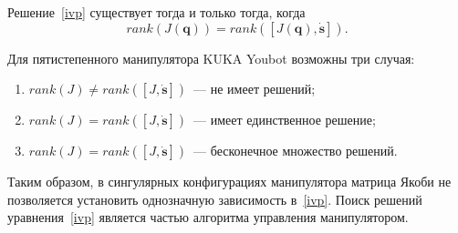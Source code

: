 Решение~\eqref{ivp} существует тогда и только тогда, когда 
\begin{equation}
	rank(J(\mathbf{q})) = rank([J(\mathbf{q}), \dot{\mathbf{s}}]).
\end{equation}

Для пятистепенного манипулятора KUKA Youbot возможны три случая:
\begin{enumerate}
	\item $rank(J) \ne rank([J, \dot{\mathbf{s}}])$~--- не имеет решений;
	\item $rank(J) = rank([J, \dot{\mathbf{s}}])$~--- имеет единственное решение;
	\item $rank(J) = rank([J, \dot{\mathbf{s}}])$~--- бесконечное множество решений.
\end{enumerate}

Таким образом, в сингулярных конфигурациях манипулятора матрица Якоби не позволяется установить однозначную зависимость в~\eqref{ivp}. Поиск решений уравнения~\eqref{ivp} является частью алгоритма управления манипулятором.


